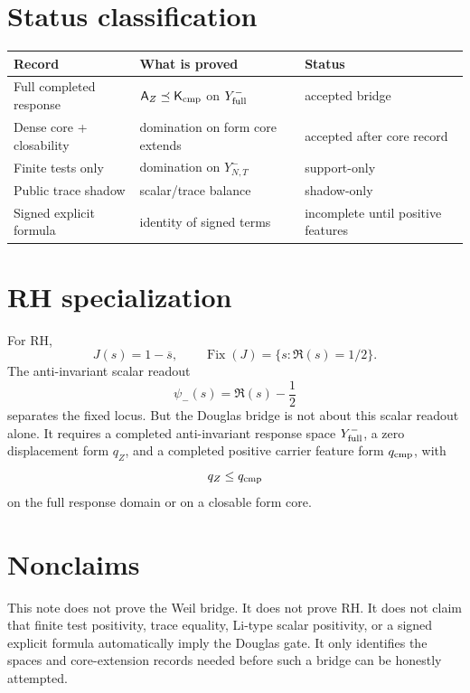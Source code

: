 \documentclass[11pt]{article}
\newcommand{\AZ}{\mathsf A_Z}
\newcommand{\Kcmp}{\mathsf K_{\rm cmp}}
\newcommand{\Yfull}{Y^-_{\rm full}}
\newcommand{\Yfin}{Y^-_{N,T}}
\newcommand{\Fix}{\operatorname{Fix}}
\begin{document}
\section{Status classification}
\begin{center}
\begin{tabular}{lll}
\toprule
Record & What is proved & Status \\
\midrule
Full completed response & \(\AZ\preceq\Kcmp\) on \(\Yfull\) & accepted bridge \\
Dense core + closability & domination on form core extends & accepted after core record \\
Finite tests only & domination on \(\Yfin\) & support-only \\
Public trace shadow & scalar/trace balance & shadow-only \\
Signed explicit formula & identity of signed terms & incomplete until positive features \\
\bottomrule
\end{tabular}
\end{center}

\section{RH specialization}
For RH,
\[
  J(s)=1-\overline s,
  \qquad
  \Fix(J)=\{s:\Re(s)=1/2\}.
\]
The anti-invariant scalar readout
\[
  \psi_-(s)=\Re(s)-\frac12
\]
separates the fixed locus.  But the Douglas bridge is not about this scalar readout alone.  It requires a completed anti-invariant response space \(\Yfull\), a zero displacement form \(q_Z\), and a completed positive carrier feature form \(q_{\rm cmp}\), with
\[
  q_Z\le q_{\rm cmp}
\]
on the full response domain or on a closable form core.

\section{Nonclaims}
This note does not prove the Weil bridge.  It does not prove RH.  It does not claim that finite test positivity, trace equality, Li-type scalar positivity, or a signed explicit formula automatically imply the Douglas gate.  It only identifies the spaces and core-extension records needed before such a bridge can be honestly attempted.
\end{document}
